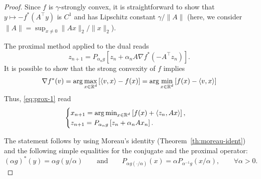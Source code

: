 \documentclass{report}
\begin{document}
\begin{proof}
	Since $f$ is $\gamma$-strongly convex, it is straightforward to show that $y\mapsto -f^*(A^\top y)$ is $C^1$ and has Lipschitz constant $\gamma/\|A\|$ (here, we consider $\|A\|=\sup_{x\neq 0} \|Ax\|_2/\|x\|_2$).

	The proximal method applied to the dual reads 
	\begin{equation}
		\label{eq:prox-1}
		z_{n+1} = P_{\alpha_n g}\left[ z_n + \alpha_n A \nabla f^*(-A^\top z_n) \right].
	\end{equation}
	It is possible to show that the strong convexity of $f$ implies
	\begin{equation}
		\nabla f^* (v) = \arg\max_{x\in\mathbb{R}^d} \left[\langle v,x\rangle - f(x) \right] 
		= \arg\min_{x\in\mathbb{R}^d} \left[f(x)-\langle v,x\rangle \right] 
	\end{equation}
	Thus, \eqref{eq:prox-1} read 
	\begin{equation}
		\begin{cases}
			x_{n+1} =\arg\min_{x\in\mathbb{R}^d} \left[f(x)+\langle z_n,Ax\rangle \right] ,\\
			z_{n+1}=P_{\alpha_n g}\left[ z_n + \alpha_n A x_n \right].
		\end{cases}
	\end{equation}
	
	The statement follows by using Moreau's identity (Theorem~\ref{th:moreau-ident}) and the following simple equalities for the conjugate and the proximal operator:
	\begin{equation}
		(\alpha g)^*(y) = \alpha g(y / \alpha)
		\qquad\text{and}\qquad 
		P_{\alpha g(\cdot/\alpha)} (x) = \alpha P_{\alpha^{-1}g}(x/\alpha), 
		\qquad \forall\alpha>0.
	\end{equation}
\end{proof}



\printbibliography
\end{document}
